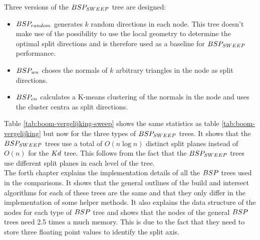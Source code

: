 Three versions of the $BSP_{SWEEP}$ tree are designed:
\begin{itemize}
  \item $BSP_{random}$ generates $k$ random directions in each node. This tree doesn't make use of the possibility to use the local geometry to determine the optimal split directions and is therefore used as a baseline for $BSP_{SWEEP}$ performance.
  \item $BSP_{wn}$ choses the normals of $k$ arbitrary triangles in the node as split directions.
  \item $BSP_{cn}$ calculates a K-means clustering of the normals in the node and uses the cluster centra as split directions.
\end{itemize}

Table \ref{tab:boom-vergelijking-sweep} shows the same statistics as table \ref{tab:boom-vergelijking} but now for the three types of $BSP_{SWEEP}$ trees. It shows that the $BSP_{SWEEP}$ trees use a total of $O(n\log n)$ distinct split planes instead of $O(n)$ for the $Kd$ tree. This follows from the fact that the $BSP_{SWEEP}$ trees use different split planes in each level of the tree.\\

The forth chapter explains the implementation details of all the $BSP$ trees used in the comparisons.
It shows that the general outlines of the build and intersect algorithms for each of these trees are the same and that they only differ in the implementation of some helper methods.
It also explains the data structure of the nodes for each type of $BSP$ tree and shows that the nodes of the general $BSP$ trees need 2.5 times a much memory. This is due to the fact that they need to store three floating point values to identify the split axis.

